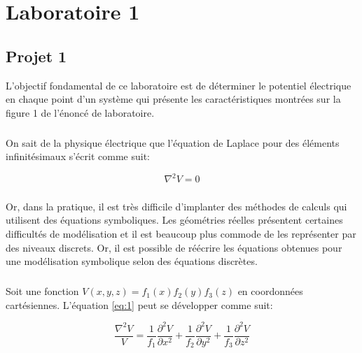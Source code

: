 



\label{s:experimentation}
\chapter{Laboratoire 1}
\section{Projet 1}

L'objectif fondamental de ce laboratoire est de déterminer le potentiel électrique en chaque point d'un système qui présente les caractéristiques montrées sur la figure 1 de l'énoncé de laboratoire. 

\paragraph{} On sait de la physique électrique que l'équation de Laplace pour des éléments infinitésimaux s'écrit comme suit:

\begin{equation}
\label{eq:1}
\nabla ^2 V = 0
\end{equation}

\paragraph{}Or, dans la pratique, il est très difficile d'implanter des méthodes de calculs qui utilisent des équations symboliques. Les géométries réelles présentent certaines difficultés de modélisation et il est beaucoup plus commode de les représenter par des niveaux discrets. Or, il est possible de réécrire les équations obtenues pour une modélisation symbolique selon des équations discrètes. 

\paragraph{}Soit une fonction $V(x,y,z) = f_1(x)f_2(y)f_3(z) $ en coordonnées cartésiennes. L'équation \ref{eq:1} peut se développer comme suit:

\begin{equation}
\frac{\nabla ^2 V}{V} = \frac{1}{f_1}\frac{\partial^2 V}{\partial x^2} + \frac{1}{f_2}\frac{\partial^2 V}{\partial y^2} + \frac{1}{f_3}\frac{\partial^2 V}{\partial z^2}
\end{equation}

